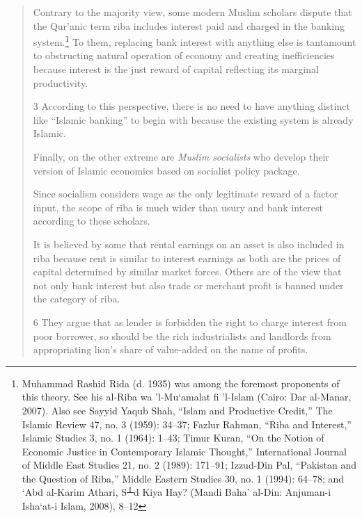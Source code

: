 \begin{quote}
Contrary to the majority view, some modern Muslim scholars dispute that the Qur'anic term riba includes interest paid and charged in the banking system.\footnote{ Muhammad Rashid Rida (d. 1935) was among the foremost proponents of this theory. See his al-Riba  wa ’l-Mu‘amalat  fi ’l-Islam  (Cairo: Dar  al-Manar, 2007).  Also see  Sayyid  Yaqub Shah, “Islam  and Productive  Credit,” The  Islamic  Review  47,  no.  3 (1959):  34–37; Fazlur  Rahman, “Riba  and  Interest,”  Islamic Studies  3, no.  1 (1964):  1–43; Timur  Kuran, “On  the Notion  of Economic  Justice  in  Contemporary  Islamic  Thought,”  International  Journal  of  Middle  East Studies  21,  no. 2 (1989): 171–91;  Izzud-Din Pal,  “Pakistan and  the Question  of Riba,”  Middle Eastern Studies 30, no. 1 (1994): 64–78; and ‘Abd al-Karim Athari, S┴d Kiya Hay? (Mandi Baha’ al-Din: Anjuman-i Isha‘at-i Islam, 2008), 8–12}
To them, replacing bank interest with anything else is tantamount to obstructing natural operation of economy and creating inefficiencies because interest is the just reward of capital reflecting its marginal productivity. 

3 According to this perspective, there is no need to have anything distinct like “Islamic banking” to begin with because the existing system is already Islamic.


Finally, on the other extreme are \textit{Muslim socialists} who develop their version of Islamic economics based on socialist policy package.

 Since socialism considers wage as the only legitimate reward of a factor input, the scope of riba is much wider than usury and bank interest according to these scholars. 

It is believed by some that rental earnings on an asset is also included in riba because rent is similar to interest earnings as both are the prices of capital determined by similar market forces. Others are of the view that not only bank interest but also trade or merchant profit is banned under the category of riba.


6 They argue that as lender is forbidden the right to charge interest from poor borrower, so should be the rich industrialists and landlords from appropriating lion's share of value-added on the name of profits.


\end{quote}
